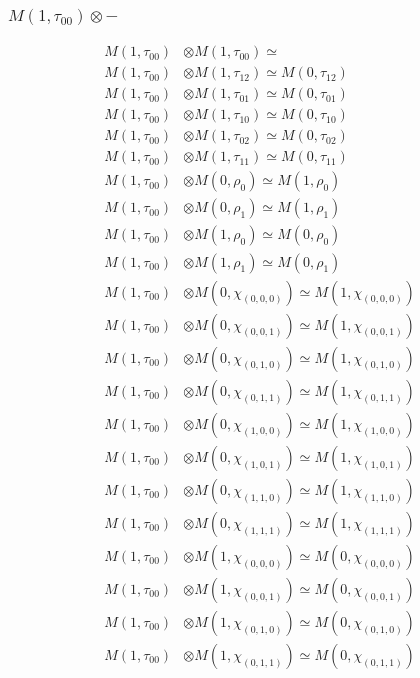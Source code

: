 \subsubsection{$ M(1,\tau_{00})\otimes -$}
\begin{align*}
M(1,\tau_{00}) &\otimes M(1,\tau_{00}) \simeq  \\
M(1,\tau_{00}) &\otimes M(1,\tau_{12}) \simeq M(0,\tau_{12}) \\
M(1,\tau_{00}) &\otimes M(1,\tau_{01}) \simeq M(0,\tau_{01}) \\
M(1,\tau_{00}) &\otimes M(1,\tau_{10}) \simeq M(0,\tau_{10}) \\
M(1,\tau_{00}) &\otimes M(1,\tau_{02}) \simeq M(0,\tau_{02}) \\
M(1,\tau_{00}) &\otimes M(1,\tau_{11}) \simeq M(0,\tau_{11}) \\
M(1,\tau_{00}) &\otimes M(0,\rho_{0}) \simeq M(1,\rho_{0}) \\
M(1,\tau_{00}) &\otimes M(0,\rho_{1}) \simeq M(1,\rho_{1}) \\
M(1,\tau_{00}) &\otimes M(1,\rho_{0}) \simeq M(0,\rho_{0}) \\
M(1,\tau_{00}) &\otimes M(1,\rho_{1}) \simeq M(0,\rho_{1}) \\
M(1,\tau_{00}) &\otimes M(0,\chi_{(0,0,0)}) \simeq M(1,\chi_{(0,0,0)}) \\
M(1,\tau_{00}) &\otimes M(0,\chi_{(0,0,1)}) \simeq M(1,\chi_{(0,0,1)}) \\
M(1,\tau_{00}) &\otimes M(0,\chi_{(0,1,0)}) \simeq M(1,\chi_{(0,1,0)}) \\
M(1,\tau_{00}) &\otimes M(0,\chi_{(0,1,1)}) \simeq M(1,\chi_{(0,1,1)}) \\
M(1,\tau_{00}) &\otimes M(0,\chi_{(1,0,0)}) \simeq M(1,\chi_{(1,0,0)}) \\
M(1,\tau_{00}) &\otimes M(0,\chi_{(1,0,1)}) \simeq M(1,\chi_{(1,0,1)}) \\
M(1,\tau_{00}) &\otimes M(0,\chi_{(1,1,0)}) \simeq M(1,\chi_{(1,1,0)}) \\
M(1,\tau_{00}) &\otimes M(0,\chi_{(1,1,1)}) \simeq M(1,\chi_{(1,1,1)}) \\
M(1,\tau_{00}) &\otimes M(1,\chi_{(0,0,0)}) \simeq M(0,\chi_{(0,0,0)}) \\
M(1,\tau_{00}) &\otimes M(1,\chi_{(0,0,1)}) \simeq M(0,\chi_{(0,0,1)}) \\
M(1,\tau_{00}) &\otimes M(1,\chi_{(0,1,0)}) \simeq M(0,\chi_{(0,1,0)}) \\
M(1,\tau_{00}) &\otimes M(1,\chi_{(0,1,1)}) \simeq M(0,\chi_{(0,1,1)}) \\

\end{align*}
